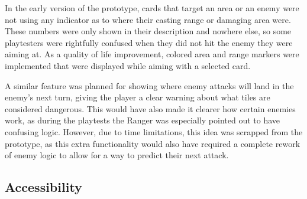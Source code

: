 In the early version of the prototype, cards that target an area or an enemy were not using any indicator as to where their casting range or damaging area were. These numbers were only shown in their description and nowhere else, so some playtesters were rightfully confused when they did not hit the enemy they were aiming at. As a quality of life improvement, colored area and range markers were implemented that were displayed while aiming with a selected card.

A similar feature was planned for showing where enemy attacks will land in the enemy's next turn, giving the player a clear warning about what tiles are considered dangerous. This would have also made it clearer how certain enemies work, as during the playtests the Ranger was especially pointed out to have confusing logic. However, due to time limitations, this idea was scrapped from the prototype, as this extra functionality would also have required a complete rework of enemy logic to allow for a way to predict their next attack.



\subsection{Accessibility}

